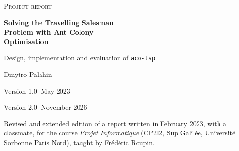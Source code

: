 \documentclass[11pt,a4paper]{article}
\newcommand{\tool}{\texttt{aco-tsp}}
\begin{document}
\begin{titlepage}
    \centering
    \vspace*{2.2cm}

    {\small\scshape\color{slate} Project report\par}
    \vspace{1.1cm}

    {\Huge\bfseries\color{ink} Solving the Travelling Salesman\\[0.25em] Problem with Ant Colony\\[0.25em] Optimisation\par}
    \vspace{0.9cm}
    {\Large\color{slate} Design, implementation and evaluation of \tool\par}
    \vspace{1.6cm}

    \vspace{1.4cm}

    {\Large Dmytro Palahin\par}
    \vspace{0.5cm}
    {\normalsize Version 1.0 \quad$\cdot$\quad May 2023\par}
    {\normalsize Version 2.0 \quad$\cdot$\quad November 2026\par}

    \vfill
    \begin{minipage}{0.86\linewidth}
        \small\color{slate}\centering
        Revised and extended edition of a report written in February 2023, with a classmate,
        for the course \emph{Projet Informatique} (CP2I2, Sup Galilée, Université Sorbonne
        Paris Nord), taught by Frédéric Roupin.
    \end{minipage}
\end{titlepage}
\end{document}
